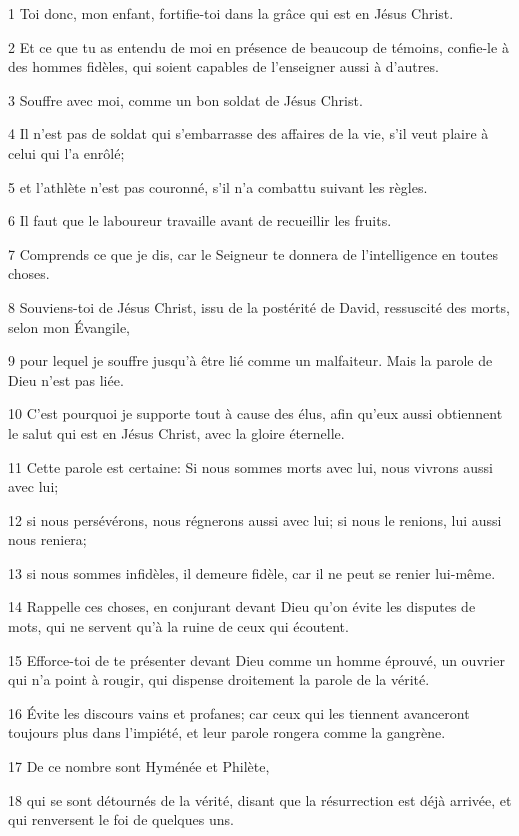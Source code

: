 \par 1 Toi donc, mon enfant, fortifie-toi dans la grâce qui est en Jésus Christ.
\par 2 Et ce que tu as entendu de moi en présence de beaucoup de témoins, confie-le à des hommes fidèles, qui soient capables de l'enseigner aussi à d'autres.
\par 3 Souffre avec moi, comme un bon soldat de Jésus Christ.
\par 4 Il n'est pas de soldat qui s'embarrasse des affaires de la vie, s'il veut plaire à celui qui l'a enrôlé;
\par 5 et l'athlète n'est pas couronné, s'il n'a combattu suivant les règles.
\par 6 Il faut que le laboureur travaille avant de recueillir les fruits.
\par 7 Comprends ce que je dis, car le Seigneur te donnera de l'intelligence en toutes choses.
\par 8 Souviens-toi de Jésus Christ, issu de la postérité de David, ressuscité des morts, selon mon Évangile,
\par 9 pour lequel je souffre jusqu'à être lié comme un malfaiteur. Mais la parole de Dieu n'est pas liée.
\par 10 C'est pourquoi je supporte tout à cause des élus, afin qu'eux aussi obtiennent le salut qui est en Jésus Christ, avec la gloire éternelle.
\par 11 Cette parole est certaine: Si nous sommes morts avec lui, nous vivrons aussi avec lui;
\par 12 si nous persévérons, nous régnerons aussi avec lui; si nous le renions, lui aussi nous reniera;
\par 13 si nous sommes infidèles, il demeure fidèle, car il ne peut se renier lui-même.
\par 14 Rappelle ces choses, en conjurant devant Dieu qu'on évite les disputes de mots, qui ne servent qu'à la ruine de ceux qui écoutent.
\par 15 Efforce-toi de te présenter devant Dieu comme un homme éprouvé, un ouvrier qui n'a point à rougir, qui dispense droitement la parole de la vérité.
\par 16 Évite les discours vains et profanes; car ceux qui les tiennent avanceront toujours plus dans l'impiété, et leur parole rongera comme la gangrène.
\par 17 De ce nombre sont Hyménée et Philète,
\par 18 qui se sont détournés de la vérité, disant que la résurrection est déjà arrivée, et qui renversent le foi de quelques uns.
